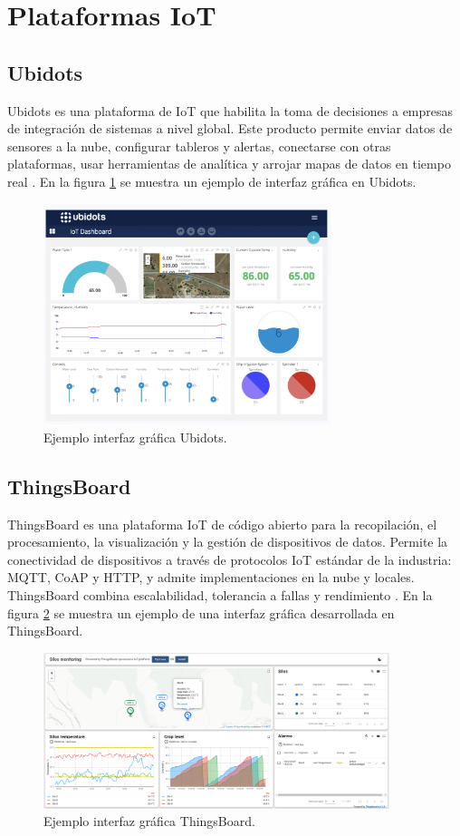 \section{Plataformas IoT}
\subsection{Ubidots}
Ubidots es una plataforma de IoT que habilita la toma de decisiones a empresas de integración de sistemas a nivel global. Este producto permite enviar datos de sensores a la nube, configurar tableros y alertas, conectarse con otras plataformas, usar herramientas de analítica y arrojar mapas de datos en tiempo real \citep{InterfazIoTUbidots}. En la figura \ref{fig:InterfazUBIDOTS} se muestra un ejemplo de interfaz gráfica en Ubidots.

\begin{figure}[htbp]
	\centering
	\includegraphics[width=0.75\textwidth]{./Figures/ubidots.png}
	\caption{Ejemplo interfaz gráfica Ubidots.}
	\label{fig:InterfazUBIDOTS}
\end{figure}
\subsection{ThingsBoard}
ThingsBoard es una plataforma IoT de código abierto para la recopilación, el procesamiento, la visualización y la gestión de dispositivos de datos.
Permite la conectividad de dispositivos a través de protocolos IoT estándar de la industria: MQTT, CoAP y HTTP, y admite implementaciones en la nube y locales. ThingsBoard combina escalabilidad, tolerancia a fallas y rendimiento \citep{THINGSBOARD}. En la figura \ref{fig:InterfazThingsBoard} se muestra un ejemplo de una interfaz gráfica desarrollada en ThingsBoard. 
\begin{figure}[htbp]
	\centering
	\includegraphics[width=0.9\textwidth]{./Figures/thingsboard.png}
	\caption{Ejemplo interfaz gráfica ThingsBoard.}
	\label{fig:InterfazThingsBoard}
\end{figure}